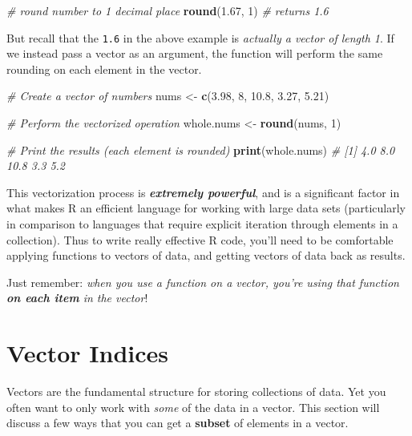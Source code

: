 \documentclass[]{book}
\newenvironment{Shaded}{\begin{snugshade}}{\end{snugshade}}
\newcommand{\KeywordTok}[1]{\textcolor[rgb]{0.13,0.29,0.53}{\textbf{#1}}}
\newcommand{\DecValTok}[1]{\textcolor[rgb]{0.00,0.00,0.81}{#1}}
\newcommand{\FloatTok}[1]{\textcolor[rgb]{0.00,0.00,0.81}{#1}}
\newcommand{\StringTok}[1]{\textcolor[rgb]{0.31,0.60,0.02}{#1}}
\newcommand{\CommentTok}[1]{\textcolor[rgb]{0.56,0.35,0.01}{\textit{#1}}}
\newcommand{\NormalTok}[1]{#1}
\theoremstyle{definition}
\theoremstyle{definition}
\theoremstyle{remark}
\begin{document}
\begin{Shaded}
\begin{Highlighting}[]
\CommentTok{# round number to 1 decimal place}
\KeywordTok{round}\NormalTok{(}\FloatTok{1.67}\NormalTok{, }\DecValTok{1}\NormalTok{)  }\CommentTok{# returns 1.6}
\end{Highlighting}
\end{Shaded}

But recall that the \texttt{1.6} in the above example is \emph{actually
a vector of length 1}. If we instead pass a vector as an argument, the
function will perform the same rounding on each element in the vector.

\begin{Shaded}
\begin{Highlighting}[]
\CommentTok{# Create a vector of numbers}
\NormalTok{nums <-}\StringTok{ }\KeywordTok{c}\NormalTok{(}\FloatTok{3.98}\NormalTok{, }\DecValTok{8}\NormalTok{, }\FloatTok{10.8}\NormalTok{, }\FloatTok{3.27}\NormalTok{, }\FloatTok{5.21}\NormalTok{)}

\CommentTok{# Perform the vectorized operation}
\NormalTok{whole.nums <-}\StringTok{ }\KeywordTok{round}\NormalTok{(nums, }\DecValTok{1}\NormalTok{)}

\CommentTok{# Print the results (each element is rounded)}
\KeywordTok{print}\NormalTok{(whole.nums)  }\CommentTok{# [1]  4.0  8.0 10.8  3.3  5.2}
\end{Highlighting}
\end{Shaded}

This vectorization process is \textbf{\emph{extremely powerful}}, and is
a significant factor in what makes R an efficient language for working
with large data sets (particularly in comparison to languages that
require explicit iteration through elements in a collection). Thus to
write really effective R code, you'll need to be comfortable applying
functions to vectors of data, and getting vectors of data back as
results.

Just remember: \emph{when you use a function on a vector, you're using
that function \textbf{on each item} in the vector}!

\section{Vector Indices}\label{vector-indices}

Vectors are the fundamental structure for storing collections of data.
Yet you often want to only work with \emph{some} of the data in a
vector. This section will discuss a few ways that you can get a
\textbf{subset} of elements in a vector.
\end{document}
